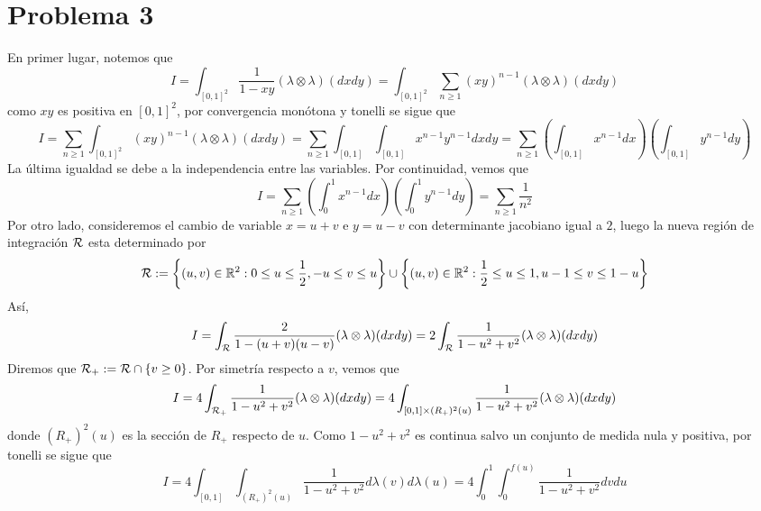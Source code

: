 \documentclass{article}
\begin{document}
\section*{Problema 3}
\noindent En primer lugar, notemos que
\begin{equation*}
    I=\int_{[0,1]^{2}}\frac{1}{1-xy}(\lambda\otimes\lambda)(dxdy)=\int_{[0,1]^{2}}
    \sum_{n\geq1}(xy)^{n-1}(\lambda\otimes\lambda)(dxdy)
\end{equation*}
como $xy$ es positiva en $[0,1]^{2}$, por convergencia monótona y tonelli se sigue que
\begin{equation*}
    I=\sum_{n\geq1}\int_{[0,1]^{2}}(xy)^{n-1}(\lambda\otimes\lambda)(dxdy)
    =\sum_{n\geq1}\int_{[0,1]}\int_{[0,1]}x^{n-1}y^{n-1}dxdy
    =\sum_{n\geq1}\left(\int_{[0,1]}x^{n-1}dx\right)\left(\int_{[0,1]}y^{n-1}dy\right)
\end{equation*}
La última igualdad se debe a la independencia entre las variables. Por continuidad, vemos que
\begin{equation*}
    I=\sum_{n\geq1}\left(\int_{0}^{1}x^{n-1}dx\right)\left(\int_{0}^{1}y^{n-1}dy\right)
    =\sum_{n\geq1}\frac{1}{n^{2}}
\end{equation*}
Por otro lado, consideremos el cambio de variable $x=u+v$ e $y=u-v$ con determinante jacobiano 
igual a $2$, luego la nueva región de integración $\mathcal{R}$ esta determinado por
\begin{equation*}
    \mathcal{R}:=\left\{(u,v)\in\mathbb{R}^{2}:0\leq u\leq\frac{1}{2},-u\leq v\leq u\right\}\cup
    \left\{(u,v)\in\mathbb{R}^{2}:\frac{1}{2}\leq u\leq1,u-1\leq v\leq 1-u\right\}
\end{equation*}
Así,
\begin{equation*}
    I=\int_{\mathcal{R}}\frac{2}{1-(u+v)(u-v)}(\lambda\otimes\lambda)(dxdy)
    =2\int_{\mathcal{R}}\frac{1}{1-u^{2}+v^{2}}(\lambda\otimes\lambda)(dxdy)
\end{equation*}
Diremos que $\mathcal{R}_{+}:=\mathcal{R}\cap\{v\geq0\}$. Por simetría respecto a $v$, vemos que
\begin{equation*}
    I=4\int_{\mathcal{R}_{+}}\frac{1}{1-u^{2}+v^{2}}(\lambda\otimes\lambda)(dxdy)
    =4\int_{[0,1]\times (R_{+})^{2}(u)}\frac{1}{1-u^{2}+v^{2}}(\lambda\otimes\lambda)(dxdy)
\end{equation*}
donde $(R_{+})^{2}(u)$ es la sección de $R_{+}$ respecto de $u$. Como $1-u^{2}+v^{2}$ es continua 
salvo un conjunto de medida nula y positiva, por tonelli se sigue que
\begin{equation*}
    I=4\int_{[0,1]}\int_{(R_{+})^{2}(u)}\frac{1}{1-u^{2}+v^{2}}d\lambda(v)d\lambda(u)
    =4\int_{0}^{1}\int_{0}^{f(u)}\frac{1}{1-u^{2}+v^{2}}dvdu
\end{equation*}
\end{document}
